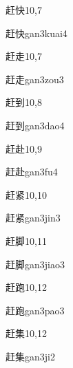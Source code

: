 \begin{entry}{赶快}{10,7}
  \begin{phonetics}{赶快}{gan3kuai4}
  \end{phonetics}
\end{entry}

\begin{entry}{赶走}{10,7}
  \begin{phonetics}{赶走}{gan3zou3}
  \end{phonetics}
\end{entry}

\begin{entry}{赶到}{10,8}
  \begin{phonetics}{赶到}{gan3dao4}
  \end{phonetics}
\end{entry}

\begin{entry}{赶赴}{10,9}
  \begin{phonetics}{赶赴}{gan3fu4}
  \end{phonetics}
\end{entry}

\begin{entry}{赶紧}{10,10}
  \begin{phonetics}{赶紧}{gan3jin3}
  \end{phonetics}
\end{entry}

\begin{entry}{赶脚}{10,11}
  \begin{phonetics}{赶脚}{gan3jiao3}
  \end{phonetics}
\end{entry}

\begin{entry}{赶跑}{10,12}
  \begin{phonetics}{赶跑}{gan3pao3}
  \end{phonetics}
\end{entry}

\begin{entry}{赶集}{10,12}
  \begin{phonetics}{赶集}{gan3ji2}
  \end{phonetics}
\end{entry}

